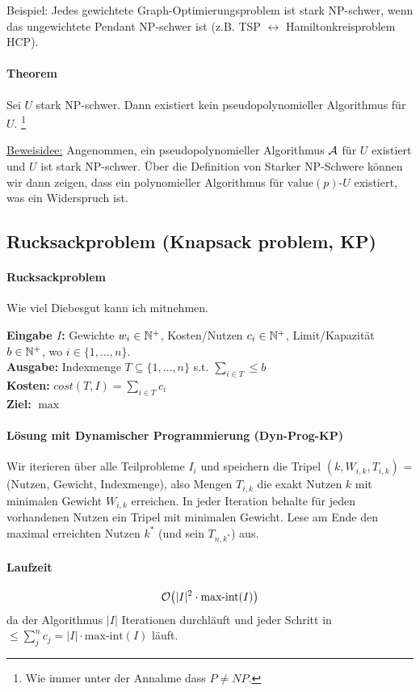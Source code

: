 Beispiel: Jedes gewichtete Graph-Optimierungsproblem ist stark NP-schwer, wenn das ungewichtete Pendant 
NP-schwer ist (z.B. TSP $\leftrightarrow$ Hamiltonkreisproblem HCP).

\paragraph{Theorem}
Sei $U$ stark NP-schwer. Dann existiert kein pseudopolynomieller Algorithmus für $U$.%
\footnote{Wie immer unter der Annahme dass $P \neq NP$.}

\underline{Beweisidee:}
Angenommen, ein pseudopolynomieller Algorithmus $\mathcal{A}$ für $U$ existiert und $U$ ist stark NP-schwer.
Über die Definition von Starker NP-Schwere können wir dann zeigen, dass ein polynomieller Algorithmus
für $\text{value}(p)\text{-}U$ existiert, was ein Widerspruch ist.


\subsection{Rucksackproblem (Knapsack problem, KP)}\label{algo-kp}

\paragraph{Rucksackproblem}
Wie viel Diebesgut kann ich mitnehmen.

\textbf{Eingabe $I$:} Gewichte $w_i \in \mathbb{N}^+$, Kosten/Nutzen $c_i \in \mathbb{N}^+$, 
Limit/Kapazität $b \in \mathbb{N}^+$, wo $i \in \{ 1, \dots, n \} $. \\
\textbf{Ausgabe:} Indexmenge $T \subseteq \{ 1, \dots, n \}$ s.t. $\sum_{i \in T } \leq b$ \\
\textbf{Kosten:} $cost(T, I) = \sum_{i \in T} c_i$ \\
\textbf{Ziel:} $\max$

\paragraph{Lösung mit Dynamischer Programmierung (Dyn-Prog-KP)} 
Wir iterieren über alle Teilprobleme $I_i$ und speichern die Tripel
$(k, W_{i, k}, T_{i, k})$ = (Nutzen, Gewicht, Indexmenge), also Mengen $T_{i, k}$
die exakt Nutzen $k$ mit minimalen Gewicht $W_{i, k}$ erreichen.
In jeder Iteration behalte für jeden vorhandenen Nutzen ein Tripel mit minimalen Gewicht.
Lese am Ende den maximal erreichten Nutzen $k^*$ (und sein $T_{n, k^*}$) aus.

\paragraph{Laufzeit} \[\mathcal{O} \big( |I|^2 \cdot \text{max-int}(I) \big)\] da der 
Algorithmus $|I|$ Iterationen durchläuft und
jeder Schritt in $\leq \sum_j^n c_j = |I| \cdot \text{max-int}(I)$ läuft.

